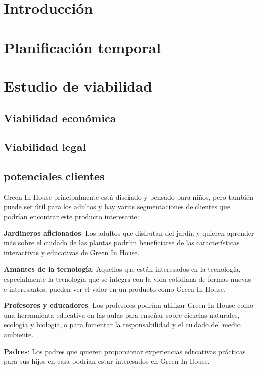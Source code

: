 
\section{Introducción}



\section{Planificación temporal}

\section{Estudio de viabilidad}

\subsection{Viabilidad económica}

\subsection{Viabilidad legal}

\subsection{potenciales clientes}

Green In House principalmente está diseñado y pensado para niños, pero también puede ser útil para los adultos y hay varias segmentaciones de clientes que podrían encontrar este producto interesante:

\textbf{Jardineros aficionados}: Los adultos que disfrutan del jardín y quieren aprender más sobre el cuidado de las plantas podrían beneficiarse de las características interactivas y educativas de Green In House.

\textbf{Amantes de la tecnología}: Aquellos que están interesados en la tecnología, especialmente la tecnología que se integra con la vida cotidiana de formas nuevas e interesantes, pueden ver el valor en un producto como Green In House.

\textbf{Profesores y educadores}: Los profesores podrían utilizar Green In House como una herramienta educativa en las aulas para enseñar sobre ciencias naturales, ecología y biología, o para fomentar la responsabilidad y el cuidado del medio ambiente.

\textbf{Padres}: Los padres que quieren proporcionar experiencias educativas prácticas para sus hijos en casa podrían estar interesados en Green In House.

